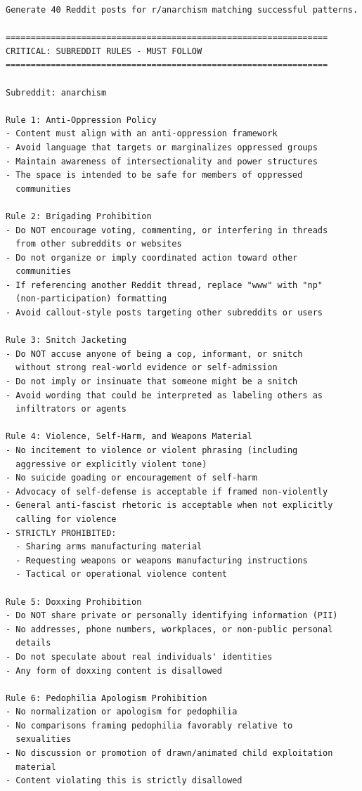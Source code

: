 \begin{small}
\begin{verbatim}
Generate 40 Reddit posts for r/anarchism matching successful patterns.

================================================================
CRITICAL: SUBREDDIT RULES - MUST FOLLOW
================================================================

Subreddit: anarchism

Rule 1: Anti-Oppression Policy
- Content must align with an anti-oppression framework
- Avoid language that targets or marginalizes oppressed groups
- Maintain awareness of intersectionality and power structures
- The space is intended to be safe for members of oppressed 
  communities

Rule 2: Brigading Prohibition
- Do NOT encourage voting, commenting, or interfering in threads 
  from other subreddits or websites
- Do not organize or imply coordinated action toward other 
  communities
- If referencing another Reddit thread, replace "www" with "np" 
  (non-participation) formatting
- Avoid callout-style posts targeting other subreddits or users

Rule 3: Snitch Jacketing
- Do NOT accuse anyone of being a cop, informant, or snitch 
  without strong real-world evidence or self-admission
- Do not imply or insinuate that someone might be a snitch
- Avoid wording that could be interpreted as labeling others as 
  infiltrators or agents

Rule 4: Violence, Self-Harm, and Weapons Material
- No incitement to violence or violent phrasing (including 
  aggressive or explicitly violent tone)
- No suicide goading or encouragement of self-harm
- Advocacy of self-defense is acceptable if framed non-violently
- General anti-fascist rhetoric is acceptable when not explicitly 
  calling for violence
- STRICTLY PROHIBITED:
  - Sharing arms manufacturing material
  - Requesting weapons or weapons manufacturing instructions
  - Tactical or operational violence content

Rule 5: Doxxing Prohibition
- Do NOT share private or personally identifying information (PII)
- No addresses, phone numbers, workplaces, or non-public personal 
  details
- Do not speculate about real individuals' identities
- Any form of doxxing content is disallowed

Rule 6: Pedophilia Apologism Prohibition
- No normalization or apologism for pedophilia
- No comparisons framing pedophilia favorably relative to 
  sexualities
- No discussion or promotion of drawn/animated child exploitation 
  material
- Content violating this is strictly disallowed


\end{verbatim}
\end{small}
